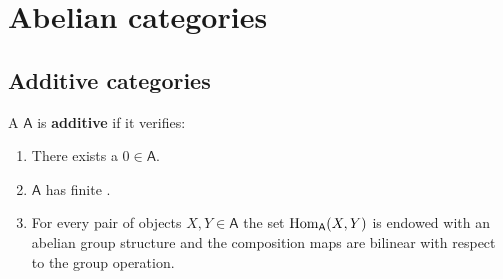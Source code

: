 \documentclass[../../main]{subfiles}
\begin{document}
\chapter{Abelian categories}
\section{Additive categories}
\begin{definition} \label{def:additive-category}
  A  \(\mathsf{A}\) is \textbf{additive} if it verifies:
  \begin{enumerate}[label=A.\arabic*), ref=A.\arabic*]
    \item\label{axiom:additive-zero} There exists a  \(0 \in \mathsf{A}\).
    \item\label{axiom:additive-products} \(\mathsf{A}\) has finite .
    \item\label{axiom:additive-hom} For every pair of objects \(X, Y \in \mathsf{A}\) the set \(\operatorname{Hom}_{\mathsf{A}}(X, Y)\) is endowed with an abelian group structure and the composition maps are bilinear with respect to the group operation.
  \end{enumerate}
\end{definition}
\end{document}
